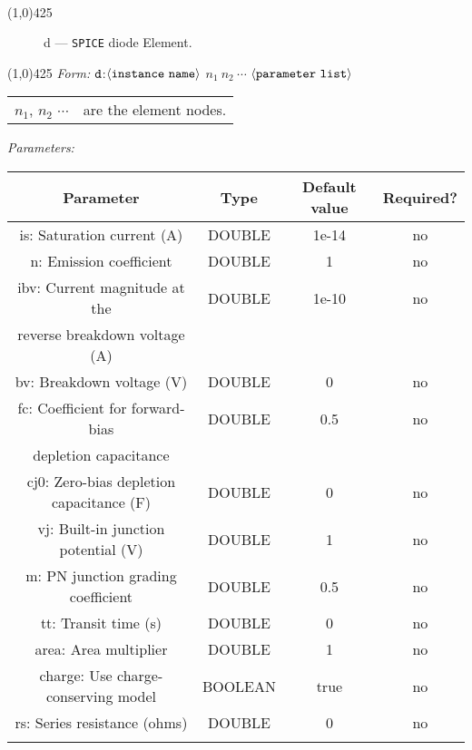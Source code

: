 \documentclass{article}
\begin{document}
\\
\hrulefill \linethickness{0.5mm} \line(1,0){425}
\normalsize
\newline
\begin{figure}[h]
\centerline{\epsfxsize=1in} \caption{d ---
\texttt{SPICE} diode Element.}
\end{figure}
\newline
\linethickness{0.5mm} \line(1,0){425}
\newline
\textit{Form:}
\newline
$\tt d$:$\langle \tt{instance\ name}\rangle$ $n_1\ n_2\ \cdots$
$\langle \tt{parameter\ list}\rangle$
\newline
\begin{tabular}{r l}
$n_1$, $n_2$ $\cdots$ & are the element nodes. \\
\end{tabular}
\newline
\textit{Parameters:}
\begin{table}[H]
\begin{tabular}{|c|c|c|c|}
\hline
Parameter&Type&Default value&Required?\\
\hline
is: Saturation current (A) & DOUBLE & 1e-14 & no \\
\hline
n: Emission coefficient & DOUBLE & 1 & no \\
\hline
ibv: Current magnitude at the & DOUBLE & 1e-10 & no  \\
reverse breakdown voltage (A) & & & \\
\hline
bv: Breakdown voltage (V) & DOUBLE & 0 & no  \\
\hline
fc: Coefficient for forward-bias & DOUBLE & 0.5 & no  \\
depletion capacitance & & & \\
\hline
cj0: Zero-bias depletion capacitance (F) & DOUBLE & 0 & no  \\
\hline
vj: Built-in junction potential (V) & DOUBLE & 1 & no  \\
\hline
m: PN junction grading coefficient & DOUBLE & 0.5 & no  \\
\hline
tt: Transit time (s) & DOUBLE & 0 & no  \\
\hline
area: Area multiplier & DOUBLE & 1 & no  \\
\hline
charge: Use charge-conserving model & BOOLEAN & true & no  \\
\hline
rs: Series resistance (ohms) & DOUBLE & 0 & no  \\
\par
\hline
\end{tabular}
\end{table}
\end{document}
